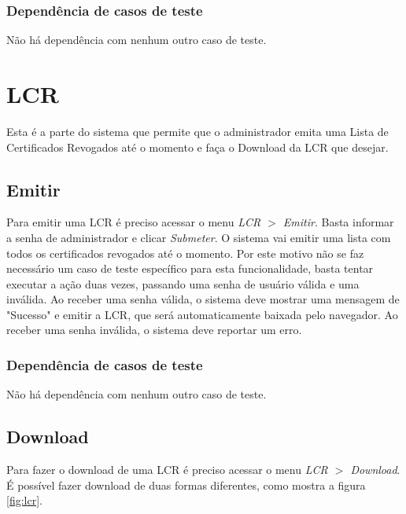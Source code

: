 \subsubsection{Dependência de casos de teste}
Não há dependência com nenhum outro caso de teste.

\section{LCR}

Esta é a parte do sistema que permite que o administrador emita uma Lista de Certificados Revogados até o momento e faça o Download da LCR que desejar.

\subsection{Emitir}

Para emitir uma LCR é preciso acessar o menu \textit{LCR $>$ Emitir}. Basta informar a senha de administrador e clicar \emph{Submeter}. O sistema vai emitir uma lista com todos os certificados revogados até o momento. Por este motivo não se faz necessário um  caso de teste específico para esta funcionalidade, basta tentar executar a ação duas vezes, passando uma senha de usuário válida e uma inválida. Ao receber uma senha válida, o sistema deve mostrar uma mensagem de "Sucesso" e emitir a LCR, que será automaticamente baixada pelo navegador. Ao receber uma senha inválida, o sistema deve reportar um erro.

\subsubsection{Dependência de casos de teste}
Não há dependência com nenhum outro caso de teste.

\subsection{Download}

Para fazer o download de uma LCR é preciso acessar o menu \textit{LCR $>$ Download}. É possível fazer download de duas formas diferentes, como mostra a figura \ref{fig:lcr}. 

